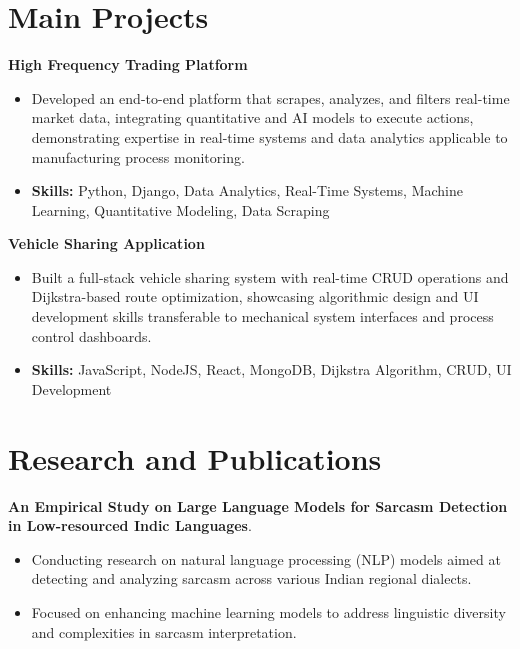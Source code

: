 \documentclass[a4paper,11pt]{article}
\begin{document}
\section{\textbf{Main Projects}}

\vspace{1mm}
  \textbf{High Frequency Trading Platform  }
\vspace{-1.5mm} %
\begin{itemize}
  \item Developed an end-to-end platform that scrapes, analyzes, and filters real-time market data, integrating quantitative and AI models to execute actions, demonstrating expertise in real-time systems and data analytics applicable to manufacturing process monitoring.
\vspace{-3mm}
  \item \textbf{Skills:} Python, Django, Data Analytics, Real-Time Systems, Machine Learning, Quantitative Modeling, Data Scraping
\end{itemize}


\vspace{1mm}
   \textbf{Vehicle Sharing Application }
\vspace{-1.5mm} %
\begin{itemize}
  \item Built a full-stack vehicle sharing system with real-time CRUD operations and Dijkstra-based route optimization, showcasing algorithmic design and UI development skills transferable to mechanical system interfaces and process control dashboards.
\vspace{-3mm}
  \item \textbf{Skills:} JavaScript, NodeJS, React, MongoDB, Dijkstra Algorithm, CRUD, UI Development
\end{itemize}



\section{\textbf{Research and Publications} \hfill }
\vspace{1mm}
  \textbf{An Empirical Study on Large Language Models for Sarcasm Detection in Low-resourced Indic Languages}.
\vspace{-1mm} %
\begin{itemize}
  \item Conducting research on natural language processing (NLP) models aimed at detecting and analyzing sarcasm across various Indian regional dialects.
\vspace{-3mm}
  \item Focused on enhancing machine learning models to address linguistic diversity and complexities in sarcasm interpretation.
\end{itemize}
\end{document}
